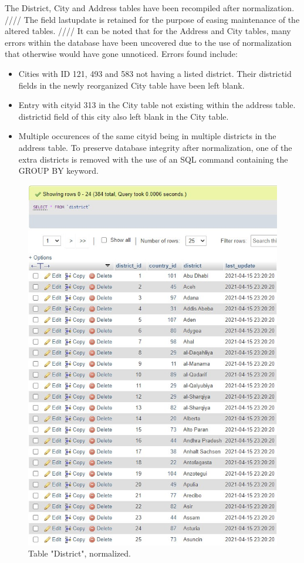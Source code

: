 \documentclass{article}
\begin{document}
		The District, City and Address tables have been recompiled after normalization. ////
		The field last\textunderscore update is retained for the purpose of easing maintenance of the altered tables. ////
		It can be noted that for the Address and City tables, many errors within the database have been uncovered due to the use of normalization that otherwise would have gone unnoticed.  Errors found include: 
		\begin{itemize}
			\item Cities with ID 121, 493 and 583 not having a listed district. Their district\textunderscore id fields in the newly reorganized City table have been left blank.
			\item Entry with city\textunderscore id 313 in the City table not existing within the address table. district\textunderscore id field of this city also left blank in the City table.
			\item Multiple occurences of the same city\textunderscore id being in multiple districts in the address table. To preserve database integrity after normalization, one of the extra districts is removed with the use of an SQL command containing the GROUP BY keyword. 
		\end{itemize}
		\begin{figure}[H]
			\includegraphics[width=\textwidth]{table_district_norm}
			\caption{Table "District", normalized.}
		\end{figure}
\end{document}
